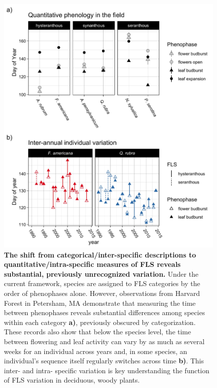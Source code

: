 \documentclass{article}
\begin{document}
 
 \begin{figure}[h!]
        \centering
          \includegraphics[width=\textwidth]{..//HarvardForest/FLS_viz.jpeg}
          \caption{\textbf{The shift from categorical/inter-specific descriptions to quantitative/intra-specific measures of FLS reveals substantial, previously unrecognized variation.} Under the current framework, species are assigned to FLS categories by the order of phenophases alone. However, observations from Harvard Forest in Petersham, MA demonstrate that measuring the time between phenophases reveals substantial differences among species within each category \textbf{a)}, previously obscured by categorization. These records also show that below the species level, the time between flowering and leaf activity can vary by as much as several weeks for an individual across years and, in some species, an individual's sequence itself regularly switches across time  \textbf{b)}. This inter- and intra- specific variation is key understanding the function of FLS variation in deciduous, woody plants.}
        \label{fig:vizzy}
    \end{figure}

\pagebreak  
\end{document}
